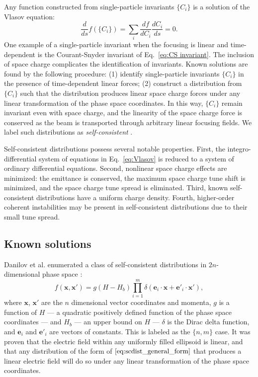 Any function constructed from single-particle invariants $\{C_i\}$ is a solution of the Vlasov equation:
%
\begin{equation}\label{eq:vlasov_equilibria}
    \frac{d}{ds} f(\{C_i\}) = \sum_{i}{\frac{df}{dC_i}\frac{dC_i}{ds}} = 0.
\end{equation}
%
One example of a single-particle invariant when the focusing is linear and time-dependent is the Courant-Snyder invariant of Eq.~\eqref{eq:CS invariant}. The inclusion of space charge complicates the identification of invariants. Known solutions are found by the following procedure: (1) identify single-particle invariants $\{C_i\}$ in the presence of time-dependent linear forces; (2) construct a distribution from $\{C_i\}$ such that the distribution produces linear space charge forces under any linear transformation of the phase space coordinates. In this way, $\{C_i\}$ remain invariant even with space charge, and the linearity of the space charge force is conserved as the beam is transported through arbitrary linear focusing fields. We label such distributions as \textit{self-consistent} \cite{Danilov2003}. 

Self-consistent distributions possess several notable properties. First, the integro-differential system of equations in Eq.~\eqref{eq:Vlasov} is reduced to a system of ordinary differential equations. Second, nonlinear space charge effects are minimized: the emittance is conserved, the maximum space charge tune shift is minimized, and the space charge tune spread is eliminated. Third, known self-consistent distributions have a uniform charge density. Fourth, higher-order coherent instabilities may be present in self-consistent distributions due to their small tune spread.



\subsection{Known solutions}

Danilov et al. enumerated a class of self-consistent distributions in $2n$-dimensional phase space \cite{Danilov2003}: 
%
\begin{equation}\label{eq:scdist_general_form}
    f\left({\mathbf{x}, \mathbf{x}'}\right) = 
    g\left({H - H_b}\right)
    \prod_{i=1}^{m}\delta\left({\mathbf{e}_i \cdot \mathbf{x} 
    + \mathbf{e}'_i \cdot \mathbf{x}'}\right),
\end{equation}
%
where $\mathbf{x}$, $\mathbf{x}'$ are the $n$ dimensional vector coordinates and momenta, $g$ is a function of $H$ — a quadratic positively defined function of the phase space coordinates — and $H_b$ — an upper bound on $H$ — $\delta$ is the Dirac delta function, and $\mathbf{e}_i$ and $\mathbf{e}'_i$ are vectors of constants. This is labeled as the $\{n,m\}$ case. It was proven that the electric field within any uniformly filled ellipsoid is linear, and that any distribution of the form of $\eqref{eq:scdist_general_form}$ that produces a linear electric field will do so under any linear transformation of the phase space coordinates.

